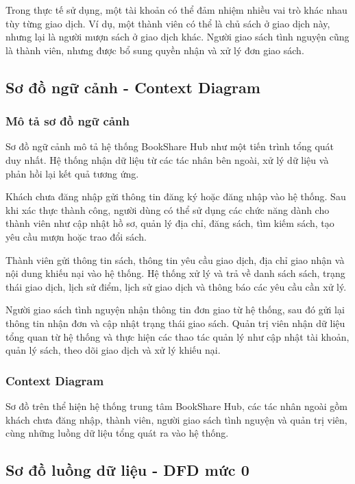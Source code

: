 Trong thực tế sử dụng, một tài khoản có thể đảm nhiệm nhiều vai trò khác nhau tùy từng giao dịch. Ví dụ, một thành viên có thể là chủ sách ở giao dịch này, nhưng lại là người mượn sách ở giao dịch khác. Người giao sách tình nguyện cũng là thành viên, nhưng được bổ sung quyền nhận và xử lý đơn giao sách.

\subsection{Sơ đồ ngữ cảnh - Context Diagram}

\subsubsection{Mô tả sơ đồ ngữ cảnh}

Sơ đồ ngữ cảnh mô tả hệ thống BookShare Hub như một tiến trình tổng quát duy nhất. Hệ thống nhận dữ liệu từ các tác nhân bên ngoài, xử lý dữ liệu và phản hồi lại kết quả tương ứng.

Khách chưa đăng nhập gửi thông tin đăng ký hoặc đăng nhập vào hệ thống. Sau khi xác thực thành công, người dùng có thể sử dụng các chức năng dành cho thành viên như cập nhật hồ sơ, quản lý địa chỉ, đăng sách, tìm kiếm sách, tạo yêu cầu mượn hoặc trao đổi sách.

Thành viên gửi thông tin sách, thông tin yêu cầu giao dịch, địa chỉ giao nhận và nội dung khiếu nại vào hệ thống. Hệ thống xử lý và trả về danh sách sách, trạng thái giao dịch, lịch sử điểm, lịch sử giao dịch và thông báo các yêu cầu cần xử lý.

Người giao sách tình nguyện nhận thông tin đơn giao từ hệ thống, sau đó gửi lại thông tin nhận đơn và cập nhật trạng thái giao sách. Quản trị viên nhận dữ liệu tổng quan từ hệ thống và thực hiện các thao tác quản lý như cập nhật tài khoản, quản lý sách, theo dõi giao dịch và xử lý khiếu nại.

\subsubsection{Context Diagram}


Sơ đồ trên thể hiện hệ thống trung tâm BookShare Hub, các tác nhân ngoài gồm khách chưa đăng nhập, thành viên, người giao sách tình nguyện và quản trị viên, cùng những luồng dữ liệu tổng quát ra vào hệ thống.

\subsection{Sơ đồ luồng dữ liệu - DFD mức 0}

